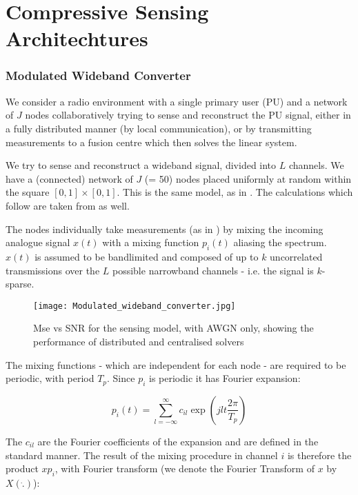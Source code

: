 \chapter{Compressive Sensing Architechtures}\label{sec:sensingmodel}

\subsection{Modulated Wideband Converter}
We consider a radio environment with a single primary user (PU) and a network of \(J\) nodes collaboratively trying to sense and reconstruct the PU signal, either in a fully distributed manner (by local communication), or by transmitting measurements to a fusion centre which then solves the linear system. 

We try to sense and reconstruct a wideband signal, divided into \(L\) channels. We have a (connected) network of \(J\) (= 50) nodes placed uniformly at random within the square \(  \left[0,1\right]\times \left[0,1\right] \). This is the same model, as in \cite{Zhang2011b}. The calculations which follow are taken from \cite{Zhang2011b} as well.

The nodes individually take measurements (as in \cite{mishali2010theory}) by mixing the incoming analogue signal \(x\left(t\right)\) with a mixing function \(p_i\left(t\right)\) aliasing the spectrum. \(x\left(t\right)\) is assumed to be bandlimited and composed of up to \(k\) uncorrelated transmissions over the \(L\) possible narrowband channels - i.e. the signal is \(k\)-sparse. 

\begin{figure}[h]
\centering
\texttt{[image: Modulated\_wideband\_converter.jpg]}
\caption{Mse vs SNR for the sensing model, with AWGN only, showing the performance of distributed and centralised solvers}
\label{msevssnr0}
\end{figure}

The mixing functions - which are independent for each node - are required to be periodic, with period \(T_p\). Since \(p_i\) is periodic it has Fourier expansion:

\begin{equation}
p_i\left(t\right) = \sum_{l=-\infty}^{\infty} c_{il} \exp\left({jlt\frac{2\pi}{T_p}}\right)
\end{equation}

The \(c_{il}\) are the Fourier coefficients of the expansion and are defined in the standard manner. The result of the mixing procedure in channel \(i\) is therefore the product \(xp_i\), with Fourier transform (we denote the Fourier Transform of \(x\) by \(X\left( \dot{.} \right)\)):

